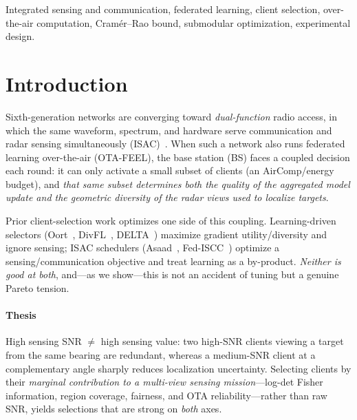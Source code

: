 \documentclass[journal,onecolumn,11pt]{IEEEtran}
\begin{document}
\begin{IEEEkeywords}
Integrated sensing and communication, federated learning, client selection, over-the-air
computation, Cram\'er--Rao bound, submodular optimization, experimental design.
\end{IEEEkeywords}

\section{Introduction}
Sixth-generation networks are converging toward \emph{dual-function} radio access, in
which the same waveform, spectrum, and hardware serve communication and radar sensing
simultaneously (ISAC)~\cite{isac_survey}. When such a network also runs federated
learning over-the-air (OTA-FEEL), the base station (BS) faces a coupled decision each
round: it can only activate a small subset of clients (an AirComp/energy budget), and
\emph{that same subset determines both the quality of the aggregated model update and the
geometric diversity of the radar views used to localize targets}.

Prior client-selection work optimizes one side of this coupling. Learning-driven
selectors (Oort~\cite{oort2021}, DivFL~\cite{divfl2022}, DELTA~\cite{delta2023}) maximize
gradient utility/diversity and ignore sensing; ISAC schedulers
(Asaad~\cite{asaad2025}, Fed-ISCC~\cite{fediscc2024}) optimize a sensing/communication
objective and treat learning as a by-product. \emph{Neither is good at both}, and---as we
show---this is not an accident of tuning but a genuine Pareto tension.

\paragraph{Thesis} High sensing SNR $\neq$ high sensing value: two high-SNR clients viewing
a target from the same bearing are redundant, whereas a medium-SNR client at a
complementary angle sharply reduces localization uncertainty. Selecting clients by their
\emph{marginal contribution to a multi-view sensing mission}---log-det Fisher information,
region coverage, fairness, and OTA reliability---rather than raw SNR, yields selections
that are strong on \emph{both} axes.
\end{document}
